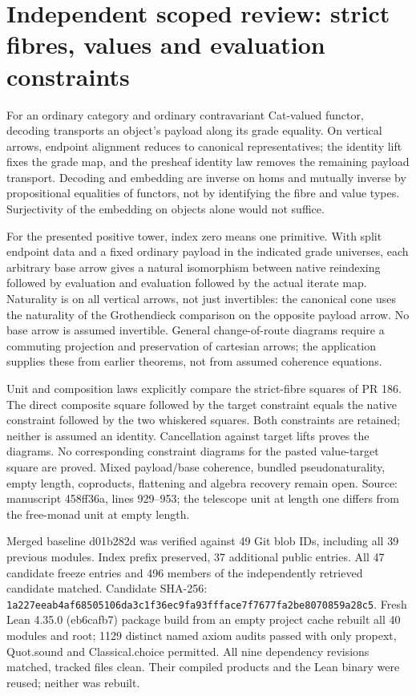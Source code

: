 \documentclass{article}
\begin{document}
\section*{Independent scoped review: strict fibres, values and evaluation constraints}
For an ordinary category and ordinary contravariant Cat-valued functor, decoding transports an object's payload along its grade equality. On vertical arrows, endpoint alignment reduces to canonical representatives; the identity lift fixes the grade map, and the presheaf identity law removes the remaining payload transport. Decoding and embedding are inverse on homs and mutually inverse by propositional equalities of functors, not by identifying the fibre and value types. Surjectivity of the embedding on objects alone would not suffice.
\par For the presented positive tower, index zero means one primitive. With split endpoint data and a fixed ordinary payload in the indicated grade universes, each arbitrary base arrow gives a natural isomorphism between native reindexing followed by evaluation and evaluation followed by the actual iterate map. Naturality is on all vertical arrows, not just invertibles: the canonical cone uses the naturality of the Grothendieck comparison on the opposite payload arrow. No base arrow is assumed invertible. General change-of-route diagrams require a commuting projection and preservation of cartesian arrows; the application supplies these from earlier theorems, not from assumed coherence equations.
\par Unit and composition laws explicitly compare the strict-fibre squares of PR 186. The direct composite square followed by the target constraint equals the native constraint followed by the two whiskered squares. Both constraints are retained; neither is assumed an identity. Cancellation against target lifts proves the diagrams. No corresponding constraint diagrams for the pasted value-target square are proved. Mixed payload/base coherence, bundled pseudonaturality, empty length, coproducts, flattening and algebra recovery remain open. Source: manuscript 458ff36a, lines 929--953; the telescope unit at length one differs from the free-monad unit at empty length.
\par Merged baseline d01b282d was verified against 49 Git blob IDs, including all 39 previous modules. Index prefix preserved, 37 additional public entries. All 47 candidate freeze entries and 496 members of the independently retrieved candidate matched. Candidate SHA-256: \texttt{1a227eeab4af68505106da3c1f36ec9fa93ffface7f7677fa2be8070859a28c5}. Fresh Lean 4.35.0 (eb6cafb7) package build from an empty project cache rebuilt all 40 modules and root; 1129 distinct named axiom audits passed with only propext, Quot.sound and Classical.choice permitted. All nine dependency revisions matched, tracked files clean. Their compiled products and the Lean binary were reused; neither was rebuilt.
\end{document}
